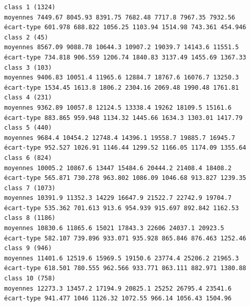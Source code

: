 \documentclass[land,article,submit,pdftex,moreauthors]{Definitions/mdpi}
\begin{document}
\begin{scriptsize}
\begin{verbatim}
class 1 (1324)
moyennes 7449.67 8045.93 8391.75 7682.48 7717.8 7967.35 7932.56
écart-type 601.978 688.822 1056.25 1103.94 1514.98 743.361 454.946
class 2 (45)
moyennes 8567.09 9088.78 10644.3 10907.2 19039.7 14143.6 11551.5
écart-type 734.818 906.559 1206.74 1840.83 3137.49 1455.69 1367.33
class 3 (103)
moyennes 9406.83 10051.4 11965.6 12884.7 18767.6 16076.7 13250.3
écart-type 1534.45 1613.8 1806.2 2304.16 2069.48 1990.48 1761.81
class 4 (231)
moyennes 9362.89 10057.8 12124.5 13338.4 19262 18109.5 15161.6
écart-type 883.865 959.948 1134.32 1445.66 1634.3 1303.01 1417.79
class 5 (440)
moyennes 9684.4 10454.2 12748.4 14396.1 19558.7 19885.7 16945.7
écart-type 952.527 1026.91 1146.44 1299.52 1166.05 1174.09 1355.64
class 6 (824)
moyennes 10005.2 10867.6 13447 15484.6 20444.2 21408.4 18408.2
écart-type 565.871 730.278 963.802 1086.09 1046.68 913.827 1239.35
class 7 (1073)
moyennes 10391.9 11352.3 14229 16647.9 21522.7 22742.9 19704.7
écart-type 535.362 701.613 913.6 954.939 915.697 892.842 1162.53
class 8 (1186)
moyennes 10830.6 11865.6 15021 17843.3 22606 24037.1 20923.5
écart-type 582.107 739.896 933.071 935.928 865.846 876.463 1252.46
class 9 (946)
moyennes 11401.6 12519.6 15969.5 19150.6 23774.4 25206.2 21965.3
écart-type 618.501 780.555 962.566 933.771 863.111 882.971 1380.88
class 10 (758)
moyennes 12273.3 13457.2 17194.9 20825.1 25252 26795.4 23541.6
écart-type 941.477 1046 1126.32 1072.55 966.14 1056.43 1504.96


\end{verbatim}
\end{scriptsize}
\end{document}
